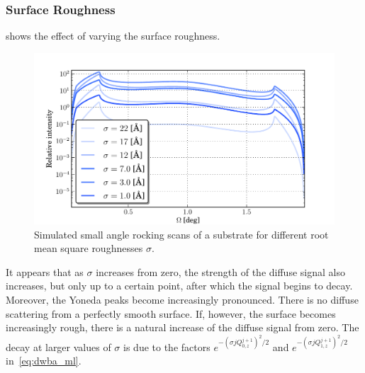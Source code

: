\documentclass[10pt,twoside, b5paper,pdftex]{report}
\begin{document}
\subsubsection{Surface Roughness}
 shows the effect of varying the surface roughness. 
\begin{figure}[htbp]
	\begin{center}
		\includegraphics[width=1.0\textwidth]{figures/var_sigma.pdf}
	\end{center}
	\caption{Simulated small angle rocking scans of a substrate for different root mean square roughnesses $\sigma$. \label{fig:var_sigma}}
\end{figure}
It appears that as $\sigma$ increases from zero, the strength of the diffuse signal also increases, but only up to a certain point, after which the signal begins to decay. Moreover, the Yoneda peaks become increasingly pronounced. There is no diffuse scattering from a perfectly smooth surface. If, however, the surface becomes increasingly rough, there is a natural increase of the diffuse signal from zero. The decay at larger values of $\sigma$ is due to the factors $e^{-(\sigma{j}Q_{0,z}^{j+1})^2/2}$ and $e^{-(\sigma{j}Q_{1,z}^{j+1})^2/2}$ in~\cref{eq:dwba_ml}. 
\end{document}
